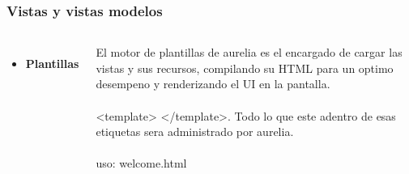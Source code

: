 \documentclass{beamer}
\begin{document}



\begin{frame}
\frametitle{Vistas y vistas modelos}
\begin{columns}[c] %

\begin{itemize}
\item \textbf{Plantillas}
\end{itemize}

El motor de plantillas de aurelia es el encargado de cargar las vistas y sus recursos, compilando su HTML para un optimo desempeno y renderizando el UI en la pantalla.
\\~\\
<template> </template>. Todo lo que este adentro de esas etiquetas sera administrado por aurelia.
\\~\\
uso: welcome.html
\end{columns}
\end{frame}
\end{document}
